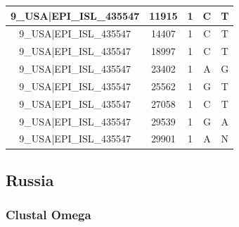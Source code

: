 \documentclass[a4paper,10pt]{article}
\begin{document}
\begin{longtable}{@{}ccccc@{}}
9\_USA|EPI\_ISL\_435547 & 11915 & 1 & C & T \\* \midrule
9\_USA|EPI\_ISL\_435547 & 14407 & 1 & C & T \\* \midrule
9\_USA|EPI\_ISL\_435547 & 18997 & 1 & C & T \\* \midrule
9\_USA|EPI\_ISL\_435547 & 23402 & 1 & A & G \\* \midrule
9\_USA|EPI\_ISL\_435547 & 25562 & 1 & G & T \\* \midrule
9\_USA|EPI\_ISL\_435547 & 27058 & 1 & C & T \\* \midrule
9\_USA|EPI\_ISL\_435547 & 29539 & 1 & G & A \\* \midrule
9\_USA|EPI\_ISL\_435547 & 29901 & 1 & A & N \\* \bottomrule
\end{longtable}

\newpage
\subsection{Russia}
\subsubsection{Clustal Omega}
\end{document}
